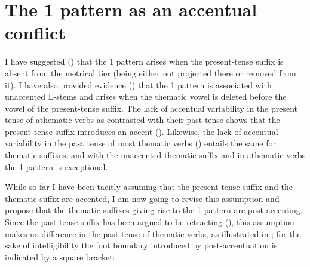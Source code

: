 \documentclass[output=paper,colorlinks,citecolor=black,koreanfont]{langscibook}
\begin{document}
\section{The {1\SG} pattern as an accentual conflict}\label{mat:sec:AccentualConflict}

I have suggested () that the {1\SG} pattern arises when the present-tense suffix is absent from the metrical tier (being either not projected there or removed from it). I have also provided evidence () that the {1\SG} pattern is associated with unaccented L-stems and arises when the thematic vowel is deleted before the vowel of the present-tense suffix. The lack of accentual variability in the present tense of athematic verbs as contrasted with their past tense shows that the present-tense suffix  introduces an accent (). Likewise, the lack of accentual variability in the past tense of most thematic verbs () entails the same for thematic suffixes, and with the unaccented thematic suffix  and in athematic verbs the {1\SG} pattern is exceptional.

While so far I have been tacitly assuming that the present-tense suffix and the thematic suffix are accented, I am now going to revise this assumption and propose that the thematic suffixes giving rise to the {1\SG}  pattern are post-accenting. Since the past-tense suffix  has been argued to be retracting (), this assumption makes no difference in the past tense of thematic verbs, as illustrated in ; for the sake of intelligibility the foot boundary introduced by post-accentuation is indicated by a square bracket:
\end{document}
